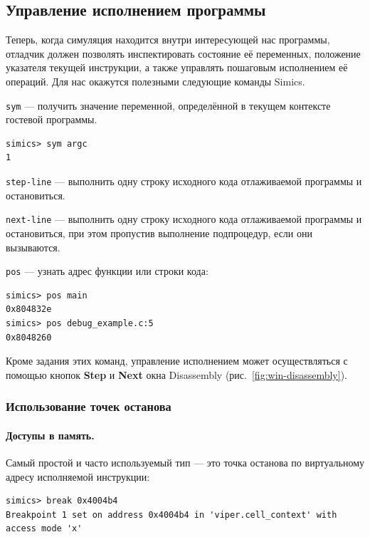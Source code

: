\subsection{Управление исполнением программы}

Теперь, когда симуляция находится внутри интересующей нас программы, отладчик должен позволять инспектировать состояние её переменных, положение указателя текущей инструкции, а также управлять пошаговым исполнением её операций. Для нас окажутся полезными следующие команды Simics.

\begin{enumerate*}
    \item \texttt{sym} --- получить значение переменной, определённой в текущем контексте гостевой программы.
\begin{lstlisting}
simics> sym argc
1
\end{lstlisting}

\item \texttt{step-line} --- выполнить одну строку исходного кода отлаживаемой программы и остановиться.
\item \texttt{next-line} --- выполнить одну строку исходного кода отлаживаемой программы и остановиться, при этом пропустив выполнение подпроцедур, если они вызываются.
\item \texttt{pos} --- узнать адрес функции или строки кода:
\begin{lstlisting}
simics> pos main
0x804832e
simics> pos debug_example.c:5
0x8048260
\end{lstlisting}

\end{enumerate*}

Кроме задания этих команд, управление исполнением может осуществляться с помощью кнопок \textbf{Step} и \textbf{Next} окна Disassembly (рис.~\ref{fig:win-disassembly}).

\subsubsection{Использование точек останова}

\paragraph{Доступы в память.}

Самый простой и часто используемый тип --- это точка останова по виртуальному адресу исполняемой инструкции:

\begin{lstlisting}
simics> break 0x4004b4
Breakpoint 1 set on address 0x4004b4 in 'viper.cell_context' with access mode 'x'
\end{lstlisting}


